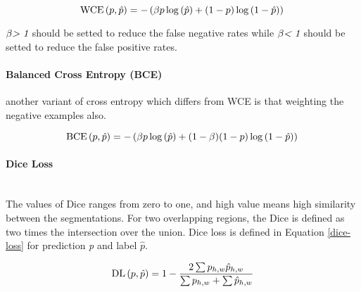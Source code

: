             \begin{equation}
                \text{WCE}\left(p, \hat{p}\right) = -\left(\beta p \log\left(\hat{p}\right) + (1-p) \log\left(1 - \hat{p}\right)\right) \label{wce-loss} \\
            \end{equation}

            $\beta \emph{> 1}$ should be setted to reduce the false negative rates while $\beta \emph{< 1}$ should be setted to reduce the false positive rates.

        \paragraph{Balanced Cross Entropy (BCE)} another variant of cross entropy which differs from WCE is that weighting the negative examples also.

            \begin{equation}
                \text{BCE}\left(p, \hat{p}\right) = -\left(\beta p \log\left(\hat{p}\right) + (1 - \beta)(1-p) \log\left(1 - \hat{p}\right)\right) \label{bce-loss} \\
            \end{equation}

        \paragraph{Dice Loss} \mbox{}\\

            The values of Dice ranges from zero to one, and high value means high similarity between the segmentations.
            For two overlapping regions, the Dice is defined as two times the intersection over the union.
            Dice loss is defined in Equation \eqref{dice-loss} for prediction \emph{p} and label $\hat{p}$.

            \begin{equation}
                \text{DL}\left(p, \hat{p}\right) = 1 - \frac{2\sum p_{h,w}\hat{p}_{h,w}}{\sum p_{h,w} + \sum \hat{p}_{h,w}} \label{dice-loss} \\
            \end{equation}
